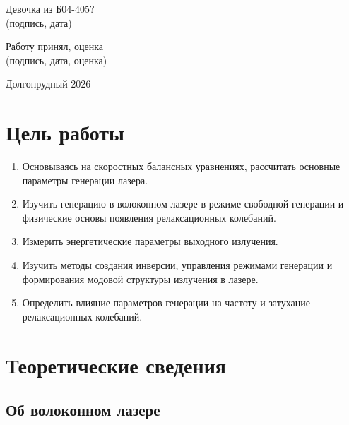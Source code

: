 \documentclass[12pt]{article}
\begin{document}
\begin{center}
\noindent
\hfill \underline{\hspace{6cm}} Девочка из Б04-405? \\
\hfill {\small (подпись, дата)}\par %

\vspace{3cm}

\noindent
Работу принял, оценка \hfill \underline{\hspace{6cm}} \\
\hfill {\small (подпись, дата, оценка)} %

\vfill

Долгопрудный 2026

\end{center}

\newpage

\thispagestyle{empty} %
\renewcommand{\contentsname}{ОГЛАВЛЕНИЕ} %
\tableofcontents
\newpage
\section{Цель работы}

    \begin{enumerate}
        \item Основываясь на скоростных балансных уравнениях, рассчитать основные параметры генерации лазера. 
        \item Изучить генерацию в волоконном лазере в режиме свободной генерации и физические основы появления релаксационных колебаний.
        \item Измерить энергетические параметры выходного излучения.
        \item Изучить методы создания инверсии, управления режимами генерации и формирования модовой структуры излучения в лазере.
        \item Определить влияние параметров генерации на частоту и затухание релаксационных колебаний.
    \end{enumerate}


\section{Теоретические сведения}

\subsection{Об волоконном лазере}
\end{document}
